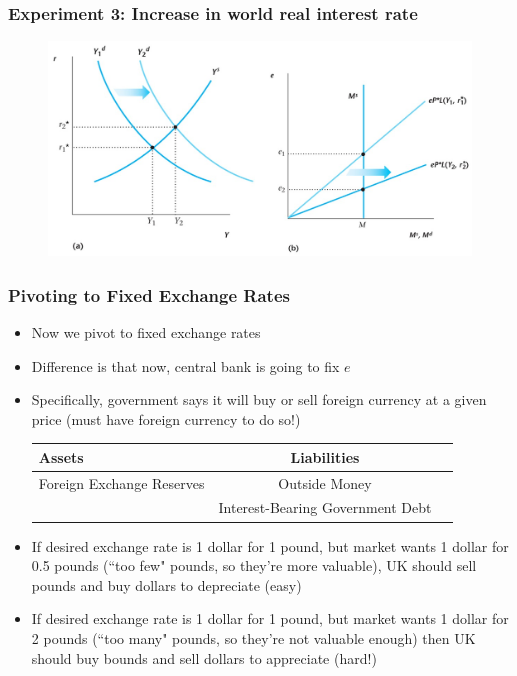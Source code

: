 \documentclass{beamer}
\begin{document}
\begin{frame}
\frametitle[alignment=center]{Experiment 3: Increase in world real interest rate}
\begin{figure}
\centering
\includegraphics[scale=0.75]{Figures/W_Fig_17pt6.png}
\end{figure}
\end{frame}


\begin{frame}
\frametitle[alignment=center]{Pivoting to Fixed Exchange Rates}
\begin{itemize}
\item Now we pivot to fixed exchange rates
\bigskip
\item Difference is that now, central bank is going to fix $e$
\bigskip
\item Specifically, government says it will buy or sell foreign currency at a given price (must have foreign currency to do so!)
\begin{table}[ht!]
\centering
\begin{tabular}{lcc}
Assets & Liabilities \\
\hline
Foreign Exchange Reserves & Outside Money \\
 & Interest-Bearing Government Debt\\
 \hline
\end{tabular}
\end{table}
\item If desired exchange rate is 1 dollar for 1 pound, but market wants 1 dollar for 0.5 pounds (``too few" pounds, so they're more valuable), UK should sell pounds and buy dollars to depreciate (easy)
\item If desired exchange rate is 1 dollar for 1 pound, but market wants 1 dollar for 2 pounds (``too many" pounds, so they're not valuable enough) then UK should buy bounds and sell dollars to appreciate (hard!)
\end{itemize}
\end{frame}
\end{document}
